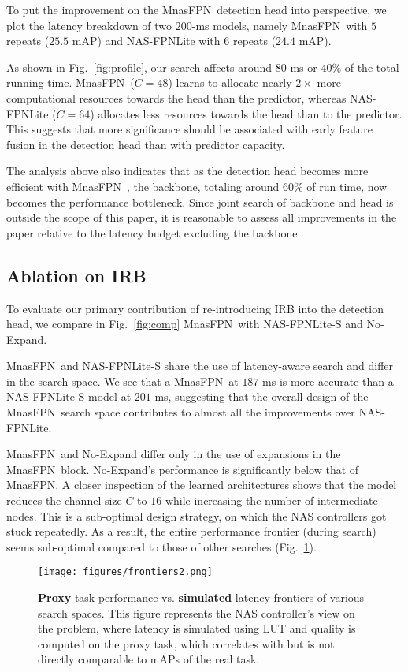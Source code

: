 \documentclass[10pt,twocolumn,letterpaper]{article}
\def\Mnasfpn{MnasFPN~}
\def\Mnasfpnnospace{MnasFPN}
\begin{document}
To put the improvement on the \Mnasfpn detection head into perspective, we plot the latency breakdown of two $200$-ms models, namely \Mnasfpn with $5$ repeats ($25.5$ mAP) and NAS-FPNLite with $6$ repeats ($24.4$ mAP). 

As shown in Fig.~\ref{fig:profile}, our search affects around $80$ ms or $40\%$ of the total running time. 
\Mnasfpn ($C=48$) learns to allocate nearly $2\times$ more computational resources towards the head than the predictor, whereas NAS-FPNLite ($C=64$) allocates less resources towards the head than to the predictor. This suggests that more significance should be associated with early feature fusion in the detection head than with predictor capacity. 

The analysis above also indicates that as the detection head becomes more efficient with \Mnasfpn, the backbone, totaling around $60\%$ of run time, now becomes the performance bottleneck. Since joint search of backbone and head is outside the scope of this paper, it is reasonable to assess all improvements in the paper relative to the latency budget excluding the backbone. 

\subsection{Ablation on IRB}
\label{sec:ablation-irb}
To evaluate our primary contribution of re-introducing IRB into the detection head, we compare in Fig.~\ref{fig:comp} \Mnasfpn with NAS-FPNLite-S and No-Expand. 

\Mnasfpn and NAS-FPNLite-S share the use of latency-aware search and differ in the search space. We see that a \Mnasfpn at $187$ ms is more accurate than a NAS-FPNLite-S  model at $201$ ms, suggesting that the overall design of the \Mnasfpn search space contributes to almost all the improvements over NAS-FPNLite. 

\Mnasfpn and No-Expand differ only in the use of expansions in the \Mnasfpn block. No-Expand's performance is significantly below that of \Mnasfpnnospace. A closer inspection of the learned architectures shows that the model reduces the channel size $C$ to $16$ while increasing the number of intermediate nodes. This is a sub-optimal design strategy, on which the NAS controllers got stuck repeatedly. As a result, the entire performance frontier (during search) seems sub-optimal compared to those of other searches (Fig.~\ref{fig:frontiers}).

\begin{figure}[!t]
    \centering
    \texttt{[image: figures/frontiers2.png]}
    \caption{{\bf Proxy} task performance vs. {\bf simulated} latency frontiers of various search spaces. This figure represents the NAS controller's view on the problem, where latency is simulated using LUT and quality is computed on the proxy task, which correlates with but is not directly comparable to mAPs of the real task.}
    \label{fig:frontiers}
\end{figure}
\end{document}
